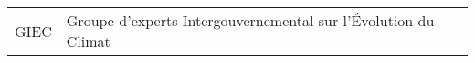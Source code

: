 \chapter*{\abbrevname}
\pagestyle{pagenumber}
%
\begin{acronym}
\end{acronym}

\begin{longtable}{lp{5in}}
    GIEC & Groupe d'experts Intergouvernemental sur l'Évolution du Climat\\
\end{longtable}

